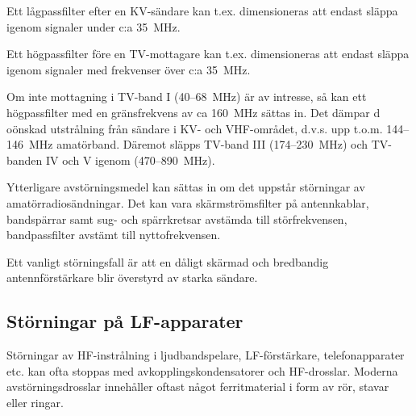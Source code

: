 Ett lågpassfilter efter en KV-sändare kan t.ex. dimensioneras att endast släppa
igenom signaler under c:a 35~MHz.

Ett högpassfilter före en TV-mottagare kan t.ex. dimensioneras att endast släppa
igenom signaler med frekvenser över c:a 35~MHz.

Om inte mottagning i TV-band I (40--68~MHz) är av intresse, så kan ett
högpassfilter med en gränsfrekvens av ca 160~MHz sättas in. Det dämpar d
oönskad utstrålning från sändare i KV- och VHF-området, d.v.s. upp
t.o.m. 144--146~MHz amatörband. Däremot släpps TV-band III (174--230~MHz) och
TV-banden IV och V igenom (470--890~MHz).

Ytterligare avstörningsmedel kan sättas in om det uppstår störningar av
amatörradiosändningar. Det kan vara skärmströmsfilter på antennkablar,
bandspärrar samt sug- och spärrkretsar avstämda till störfrekvensen,
bandpassfilter avstämt till nyttofrekvensen.

Ett vanligt störningsfall är att en dåligt skärmad och bredbandig
antennförstärkare blir överstyrd av starka sändare.

\subsection{Störningar på LF-apparater}

Störningar av HF-instrålning i ljudbandspelare, LF-förstärkare,
telefonapparater etc. kan ofta stoppas med avkopplingskondensatorer
och HF-drosslar. Moderna avstörningsdrosslar innehåller oftast något
ferritmaterial i form av rör, stavar eller ringar.
